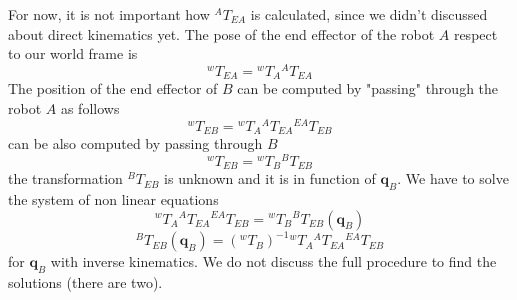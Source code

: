 \documentclass[10pt, letterpaper]{report}
\begin{document}
For now, it is not important how ${}^AT_{EA}$ is calculated, since we didn't discussed about direct kinematics yet. The pose of the end effector of the robot $A$ respect to our world frame is\begin{equation}
    {}^wT_{EA}={}^wT_{A}{}^AT_{EA}
\end{equation}
The position of the end effector of $B$ can be computed by "passing" through the robot $A$ as follows\begin{equation}
    {}^wT_{EB}={}^wT_{A}{}^AT_{EA}{}^{EA}T_{EB}
\end{equation}
can be also computed by passing through $B$\begin{equation}
    {}^wT_{EB}={}^wT_{B}{}^BT_{EB}
\end{equation}
the transformation ${}^BT_{EB}$ is unknown and it is in function of $\mathbf q_B$. We have to solve the system of non linear equations \begin{equation}
    {}^wT_{A}{}^AT_{EA}{}^{EA}T_{EB}={}^wT_{B}{}^BT_{EB}(\mathbf q_B)
\end{equation}
\begin{equation}
    {}^BT_{EB}(\mathbf q_B)=({}^wT_{B})^{-1}{}^wT_{A}{}^AT_{EA}{}^{EA}T_{EB}
\end{equation}
for $\mathbf q_B$ with inverse kinematics. We do not discuss the full procedure to find the solutions (there are two).
\end{document}
